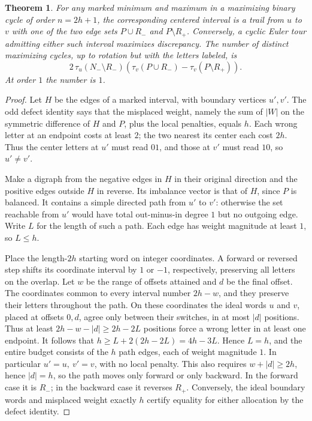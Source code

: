\documentclass[11pt]{article}
\newtheorem{theorem}{Theorem}
\begin{document}
\begin{theorem}
For any marked minimum and maximum in a maximizing binary
cycle of order \(n=2h+1\), the corresponding centered interval
is a trail from \(u\) to \(v\) with one of the two edge sets
\(P\cup R_-\) and \(P\setminus R_+\).
Conversely, a cyclic Euler tour admitting either such interval
maximizes discrepancy. The number of distinct maximizing
cycles, up to rotation but with the letters labeled, is
\[
 2\,\tau_u(N_-\setminus R_-)
       \left(\tau_v(P\cup R_-)-\tau_v(P\setminus R_+)\right).
\]
At order \(1\) the number is \(1\).
\end{theorem}
\begin{proof}
Let \(H\) be the edges of a marked interval, with boundary
vertices \(u',v'\). The odd defect identity says that the
misplaced weight, namely the sum of \(|W|\) on the symmetric
difference of \(H\) and \(P\), plus the local penalties,
equals \(h\). Each wrong letter at an endpoint costs at
least \(2\); the two nearest its center each cost \(2h\).
Thus the center letters at \(u'\) must read \(01\), and those
at \(v'\) must read \(10\), so \(u'\ne v'\).

Make a digraph from the negative edges in \(H\) in their
original direction and the positive edges outside \(H\) in
reverse. Its imbalance vector is that of \(H\), since
\(P\) is balanced. It contains a simple directed path from
\(u'\) to \(v'\): otherwise the set reachable from \(u'\)
would have total out-minus-in degree \(1\) but no outgoing
edge. Write \(L\) for the length of such a path. Each edge
has weight magnitude at least \(1\), so \(L\le h\).

Place the length-\(2h\) starting word on integer coordinates.
A forward or reversed step shifts its coordinate interval
by \(1\) or \(-1\), respectively, preserving all letters on
the overlap. Let \(w\) be the range of offsets attained and
\(d\) be the final offset. The coordinates common to every
interval number \(2h-w\), and they preserve their letters
throughout the path. On these coordinates the ideal words
\(u\) and \(v\), placed at offsets \(0,d\), agree only
between their switches, in at most \(|d|\) positions. Thus
at least \(2h-w-|d|\ge 2h-2L\) positions force a wrong
letter in at least one endpoint. It follows that
\(h\ge L+2(2h-2L)=4h-3L\).
Hence \(L=h\), and the entire budget consists of the \(h\)
path edges, each of weight magnitude \(1\). In particular
\(u'=u,\ v'=v\), with no local penalty. This also requires
\(w+|d|\ge2h\), hence \(|d|=h\), so the path moves only
forward or only backward. In the forward case it is \(R_-\);
in the backward case it reverses \(R_+\). Conversely, the
ideal boundary words and misplaced weight exactly \(h\)
certify equality for either allocation by the defect identity.


\end{proof}
\end{document}
